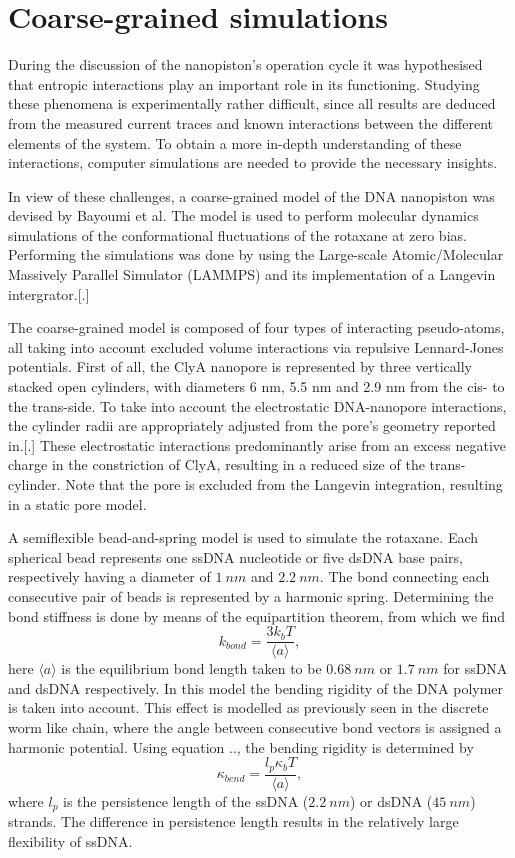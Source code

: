 \section{Coarse-grained simulations}

During the discussion of the nanopiston's operation cycle it was hypothesised
that entropic interactions play an important role in its functioning. Studying these
phenomena is experimentally rather difficult, since all results are deduced from the
measured current traces and known interactions between the different elements of the
system. To obtain a more in-depth understanding of these interactions, computer
simulations are needed to provide the necessary insights.

In view of these challenges, a coarse-grained model of the DNA nanopiston was devised by
Bayoumi et al. The model is used to perform molecular dynamics simulations of  the
conformational fluctuations of the rotaxane at zero bias. Performing the simulations was
done by using the Large-scale Atomic/Molecular Massively Parallel Simulator (LAMMPS) and
its implementation of a Langevin intergrator.[.]

The coarse-grained model is composed of four types of interacting pseudo-atoms, all
taking into account excluded volume interactions via repulsive Lennard-Jones
potentials. First of all, the ClyA nanopore is represented by three vertically stacked
open cylinders, with diameters 6 nm, 5.5 nm and 2.9 nm from the cis- to the trans-side.
To take into account the electrostatic DNA-nanopore interactions, the cylinder radii
are appropriately adjusted from the pore's geometry reported in.[.]
These electrostatic interactions predominantly arise from an excess negative charge in
the constriction of ClyA, resulting in a reduced size of the trans-cylinder. Note that
the pore is excluded from the Langevin integration, resulting in a static pore model.

A semiflexible bead-and-spring model is used to simulate the rotaxane. Each spherical
bead represents one ssDNA nucleotide or five dsDNA base pairs, respectively having a
diameter of $1\ nm$ and  $2.2\ nm$. The bond connecting each consecutive pair of beads is
represented by a harmonic spring. Determining the bond stiffness is done by means of the
equipartition theorem, from which we find
  \begin{equation}
    k_{bond} = \frac{3 k_b T }{ \langle a \rangle},
  \end{equation}
here $\langle a \rangle$ is the equilibrium bond length taken to be $0.68\ nm$ or $1.7\
nm$ for ssDNA and dsDNA respectively. In this model the bending rigidity of the DNA
polymer is taken into account. This effect is modelled as previously seen in the discrete
worm like chain, where the angle between consecutive bond vectors is assigned a harmonic
potential. Using equation .., the bending rigidity is determined by
  \begin{equation}
    \kappa_{bend} = \frac{l_{p} \kappa_b T}{\langle a \rangle},
  \end{equation}
  where $l_p$ is the persistence length of the ssDNA ($2.2\ nm$) or dsDNA ($45\ nm$)
strands. The difference in persistence length results in the relatively large flexibility
of ssDNA.

